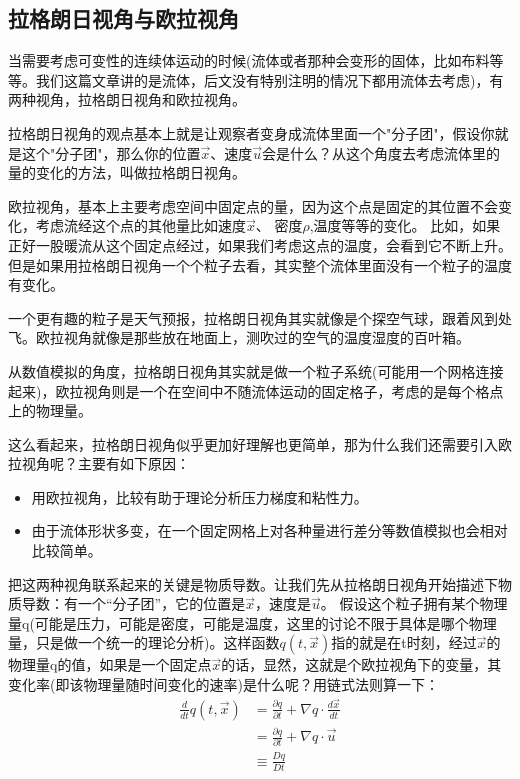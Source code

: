\documentclass{article}
\begin{document}
\subsection{拉格朗日视角与欧拉视角}
当需要考虑可变性的连续体运动的时候(流体或者那种会变形的固体，比如布料等等。我们这篇文章讲的是流体，后文没有特别注明的情况下都用流体去考虑)，有两种视角，拉格朗日视角和欧拉视角。\par
拉格朗日视角的观点基本上就是让观察者变身成流体里面一个"分子团"，假设你就是这个"分子团"，那么你的位置$\vec{x}$、速度$\vec{u}$会是什么？从这个角度去考虑流体里的量的变化的方法，叫做拉格朗日视角。\par
欧拉视角，基本上主要考虑空间中固定点的量，因为这个点是固定的其位置不会变化，考虑流经这个点的其他量比如速度$\vec{x}$、 密度$\rho$,温度等等的变化。 比如，如果正好一股暖流从这个固定点经过，如果我们考虑这点的温度，会看到它不断上升。但是如果用拉格朗日视角一个个粒子去看，其实整个流体里面没有一个粒子的温度有变化。\par
一个更有趣的粒子是天气预报，拉格朗日视角其实就像是个探空气球，跟着风到处飞。欧拉视角就像是那些放在地面上，测吹过的空气的温度湿度的百叶箱。\par
从数值模拟的角度，拉格朗日视角其实就是做一个粒子系统(可能用一个网格连接起来)，欧拉视角则是一个在空间中不随流体运动的固定格子，考虑的是每个格点上的物理量。\par
这么看起来，拉格朗日视角似乎更加好理解也更简单，那为什么我们还需要引入欧拉视角呢？主要有如下原因：
\begin{itemize}
\item 用欧拉视角，比较有助于理论分析压力梯度和粘性力。
\item 由于流体形状多变，在一个固定网格上对各种量进行差分等数值模拟也会相对比较简单。
\end{itemize}
把这两种视角联系起来的关键是物质导数。让我们先从拉格朗日视角开始描述下物质导数：有一个“分子团”，它的位置是$\vec{x}$，速度是$\vec{u}$。 假设这个粒子拥有某个物理量q(可能是压力，可能是密度，可能是温度，这里的讨论不限于具体是哪个物理量，只是做一个统一的理论分析)。这样函数$q(t,\vec{x})$指的就是在t时刻，经过$\vec{x}$的物理量q的值，如果是一个固定点$\vec{x}$的话，显然，这就是个欧拉视角下的变量，其变化率(即该物理量随时间变化的速率)是什么呢？用链式法则算一下：
\begin{equation}
\begin{aligned}
\frac{d}{dt}q(t,\vec{x})&=\frac{\partial{q}}{\partial{t}}+\nabla{q}\cdot\frac{d\vec{x}}{dt} \\
&=\frac{\partial{q}}{\partial{t}}+\nabla{q}\cdot\vec{u} \\
&\equiv{\frac{Dq}{Dt}}
\end{aligned}
\end{equation}
\end{document}
